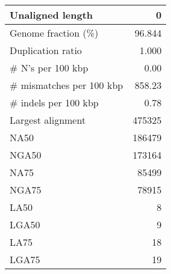 \documentclass[12pt,a4paper]{article}
\begin{document}
\begin{table}[ht]
\begin{center}
\begin{tabular}{|l*{1}{|r}|}
Unaligned length & 0 \\ \hline
Genome fraction (\%) & 96.844 \\ \hline
Duplication ratio & 1.000 \\ \hline
\# N's per 100 kbp & 0.00 \\ \hline
\# mismatches per 100 kbp & 858.23 \\ \hline
\# indels per 100 kbp & 0.78 \\ \hline
Largest alignment & 475325 \\ \hline
NA50 & 186479 \\ \hline
NGA50 & 173164 \\ \hline
NA75 & 85499 \\ \hline
NGA75 & 78915 \\ \hline
LA50 & 8 \\ \hline
LGA50 & 9 \\ \hline
LA75 & 18 \\ \hline
LGA75 & 19 \\ \hline
\end{tabular}
\end{center}
\end{table}
\end{document}
